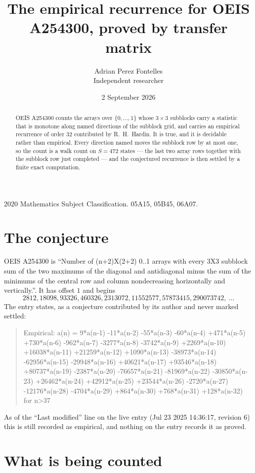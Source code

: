 \documentclass[11pt,a4paper]{article}
\title{The empirical recurrence for OEIS A254300, proved by transfer matrix}
\author{Adrian Perez Fontelles\\ \small Independent researcher}
\date{2 September 2026}
\theoremstyle{plain}
\theoremstyle{definition}
\begin{document}
\maketitle

\begin{abstract}
OEIS A254300 counts the arrays over $\{0,\dots,1\}$ whose $3\times3$ subblocks carry a
statistic that is monotone along named directions of the subblock grid, and carries an
empirical recurrence of order $32$ contributed by R.~H.~Hardin. It is true, and it is
decidable rather than empirical. Every direction named moves the subblock row by at most one,
so the count is a walk count on $S=472$ states --- the last two array rows together with the
subblock row just completed --- and the conjectured recurrence is then settled by a finite
exact computation.
\end{abstract}

\noindent\small 2020 Mathematics Subject Classification. 05A15, 05B45, 06A07.\normalsize

\section{The conjecture}

OEIS A254300 is ``Number of (n+2)X(2+2) 0..1 arrays with every 3X3 subblock sum of the two maximums of the diagonal and antidiagonal minus the sum of the minimums of the central row and column nondecreasing horizontally and vertically.''. It has offset $1$ and begins
\[
2812, 18098, 93326, 460326, 2313072, 11552577, 57873415, 290073742,\ \dots
\]
The entry states, as a conjecture contributed by its author and never marked settled:
\begin{quote}
Empirical: a(n) = 9*a(n-1) -11*a(n-2) -55*a(n-3) -60*a(n-4) +471*a(n-5) +730*a(n-6) -962*a(n-7) -3277*a(n-8) -3742*a(n-9) +2269*a(n-10) +16038*a(n-11) +21259*a(n-12) +1090*a(n-13) -38973*a(n-14) -62956*a(n-15) -29948*a(n-16) +40621*a(n-17) +93546*a(n-18) +80737*a(n-19) -2387*a(n-20) -76657*a(n-21) -81969*a(n-22) -30850*a(n-23) +26462*a(n-24) +42912*a(n-25) +23544*a(n-26) -2720*a(n-27) -12176*a(n-28) -4704*a(n-29) +864*a(n-30) +768*a(n-31) +128*a(n-32) for n>37
\end{quote}
As of the ``Last modified'' line on the live entry (Jul 23 2025 14:36:17, revision 6) this is still
recorded as empirical, and nothing on the entry records it as proved.

\section{What is being counted}
\end{document}
